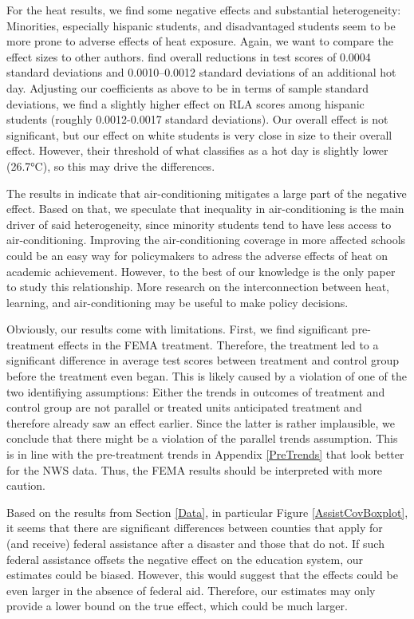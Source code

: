 For the heat results, we find some negative effects and substantial heterogeneity: Minorities, especially hispanic students, and disadvantaged students seem to be more prone to adverse effects of heat exposure. Again, we want to compare the effect sizes to other authors. \cite{Park_2020} find overall reductions in test scores of 0.0004 standard deviations and 0.0010–0.0012 standard deviations of an additional hot day. Adjusting our coefficients as above to be in terms of sample standard deviations, we find a slightly higher effect on RLA scores among hispanic students (roughly 0.0012-0.0017 standard deviations). Our overall effect is not significant, but our effect on white students is very close in size to their overall effect. However, their threshold of what classifies as a hot day is slightly lower (26.7°C), so this may drive the differences.

The results in \cite{Goodman_2020} indicate that air-conditioning mitigates a large part of the negative effect. Based on that, we speculate that inequality in air-conditioning is the main driver of said heterogeneity, since minority students tend to have less access to air-conditioning. Improving the air-conditioning coverage in more affected schools could be an easy way for policymakers to adress the adverse effects of heat on academic achievement. However, to the best of our knowledge \cite{Goodman_2020} is the only paper to study this relationship. More research on the interconnection between heat, learning, and air-conditioning may be useful to make policy decisions.

Obviously, our results come with limitations. First, we find significant pre-treatment effects in the FEMA treatment. Therefore, the treatment led to a significant difference in average test scores between treatment and control group before the treatment even began. This is likely caused by a violation of one of the two identifiying assumptions: Either the trends in outcomes of treatment and control group are not parallel or treated units anticipated treatment and therefore already saw an effect earlier. Since the latter is rather implausible, we conclude that there might be a violation of the parallel trends assumption. This is in line with the pre-treatment trends in Appendix \ref{PreTrends} that look better for the NWS data. Thus, the FEMA results should be interpreted with more caution.

Based on the results from Section \ref{Data}, in particular Figure \ref{AssistCovBoxplot}, it seems that there are significant differences between counties that apply for (and receive) federal assistance after a disaster and those that do not. If such federal assistance offsets the negative effect on the education system, our estimates could be biased. However, this would suggest that the effects could be even larger in the absence of federal aid. Therefore, our estimates may only provide a lower bound on the true effect, which could be much larger.

